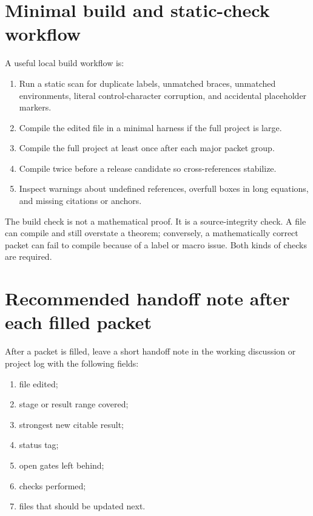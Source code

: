 \section{Minimal build and static-check workflow}
\label{sec:minimal-build-static-check-workflow}

A useful local build workflow is:

\begin{enumerate}[leftmargin=2.0em]
\item Run a static scan for duplicate labels, unmatched braces, unmatched environments, literal control-character corruption, and accidental placeholder markers.
\item Compile the edited file in a minimal harness if the full project is large.
\item Compile the full project at least once after each major packet group.
\item Compile twice before a release candidate so cross-references stabilize.
\item Inspect warnings about undefined references, overfull boxes in long equations, and missing citations or anchors.
\end{enumerate}

The build check is not a mathematical proof.  It is a source-integrity check.  A file can compile and still overstate a theorem; conversely, a mathematically correct packet can fail to compile because of a label or macro issue.  Both kinds of checks are required.

\section{Recommended handoff note after each filled packet}
\label{sec:recommended-handoff-note}

After a packet is filled, leave a short handoff note in the working discussion or project log with the following fields:

\begin{enumerate}[leftmargin=2.0em]
\item file edited;
\item stage or result range covered;
\item strongest new citable result;
\item status tag;
\item open gates left behind;
\item checks performed;
\item files that should be updated next.
\end{enumerate}

